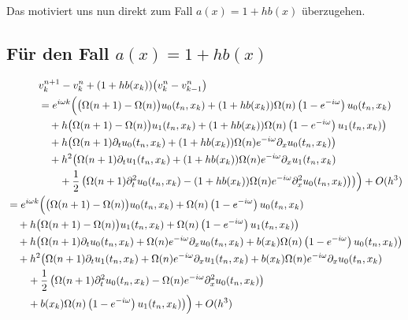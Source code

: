 Das motiviert uns nun direkt zum Fall $a(x) = 1 + hb(x)$ überzugehen.

\subsection*{Für den Fall $a(x) = 1 + h b(x)$}
{\small \begin{align}
\begin{split}
&v^{n+1}_k - v^n_k + (1 + h b(x_k)) \bigl( v^n_k - v^n_{k-1} \bigr)\\
&= e^{i \omega k} \Bigl(
\bigl(\Omega(n+1) - \Omega(n) \bigr) u_0(t_n, x_k) + (1 + h b(x_k)) \Omega(n) \left(1-e^{-i \omega}\right) u_0(t_n, x_k)\\
&\quad + h \bigl(\Omega(n+1) - \Omega(n) \bigr) u_1(t_n, x_k) + (1 + h b(x_k)) \Omega(n) \left(1-e^{-i \omega}\right) u_1(t_n, x_k) \bigr)\\
&\quad + h \bigl( \Omega(n+1) \partial_t u_0(t_n, x_k) + (1 + h b(x_k)) \Omega(n) e^{-i \omega} \partial_x u_0(t_n, x_k) \bigr)\\
&\quad + h^2 \bigl( \Omega(n+1) \partial_t u_1(t_n, x_k) + (1 + h b(x_k)) \Omega(n) e^{-i \omega} \partial_x u_1(t_n, x_k)\\
&\qquad + \frac{1}{2} \left( \Omega(n+1) \partial^2_t u_0(t_n, x_k) - (1 + h b(x_k)) \Omega(n) e^{-i \omega} \partial^2_x u_0(t_n, x_k) \right) \bigr)
\Bigr) + O(h^3)
\end{split}\\
\label{eq:wkb:letzteglg}
\begin{split}
&= e^{i \omega k} \Bigl(
\bigl(\Omega(n+1) - \Omega(n) \bigr) u_0(t_n, x_k) + \Omega(n) \left(1-e^{-i \omega}\right) u_0(t_n, x_k)\\
&\quad + h \bigl(\Omega(n+1) - \Omega(n) \bigr) u_1(t_n, x_k) + \Omega(n) \left(1-e^{-i \omega}\right) u_1(t_n, x_k) \bigr)\\
&\quad + h \bigl( \Omega(n+1) \partial_t u_0(t_n, x_k) + \Omega(n) e^{-i \omega} \partial_x u_0(t_n, x_k) + b(x_k) \Omega(n) \left(1-e^{-i \omega}\right) u_0(t_n, x_k) \bigr)\\
&\quad + h^2 \bigl( \Omega(n+1) \partial_t u_1(t_n, x_k) + \Omega(n) e^{-i \omega} \partial_x u_1(t_n, x_k) + b(x_k) \Omega(n) e^{-i \omega} \partial_x u_0(t_n, x_k)\\
&\qquad + \frac{1}{2} \left( \Omega(n+1) \partial^2_t u_0(t_n, x_k) - \Omega(n) e^{-i \omega} \partial^2_x u_0(t_n, x_k) \right)\\
&\qquad + b(x_k) \Omega(n) \left(1-e^{-i \omega}\right) u_1(t_n, x_k) \bigr) 
\Bigr) + O(h^3)
\end{split}
\end{align}}
